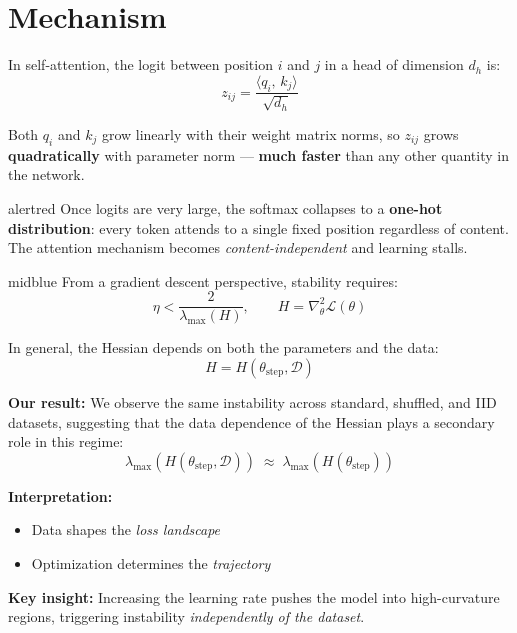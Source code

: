 \documentclass[12pt,a4paper]{article}
\newcommand{\important}[1]{\textbf{\color{midblue}#1}}
\begin{document}
\noindent
\begin{minipage}[t]{0.48\linewidth}
\section{Mechanism}

In self-attention, the logit between position $i$ and $j$ in a head of dimension $d_h$ is:
\[
z_{ij} = \frac{\langle q_i,\, k_j\rangle}{\sqrt{d_h}}
\]

Both $q_i$ and $k_j$ grow linearly with their weight matrix norms, so $z_{ij}$ grows
\textbf{quadratically} with parameter norm --- \important{much faster} than any other quantity
in the network.

\vspace{12pt}

\begin{claimbox}{alertred}
\small
Once logits are very large, the softmax collapses to a \textbf{one-hot distribution}:
every token attends to a single fixed position regardless of content.
The attention mechanism becomes \emph{content-independent} and learning stalls.
\end{claimbox}
\end{minipage}
\hfill
\begin{minipage}[t]{0.48\linewidth}
\vspace{0pt}

\begin{claimbox}{midblue}
\small
From a gradient descent perspective, stability requires:
\[
\eta < \frac{2}{\lambda_{\max}(H)}, \qquad H = \nabla^2_\theta \mathcal{L}(\theta)
\]

In general, the Hessian depends on both the parameters and the data:
\[
H = H(\theta_{\text{step}}, \mathcal{D})
\]

\medskip
\textbf{Our result:} We observe the same instability across standard, shuffled,
and IID datasets, suggesting that the data dependence of the Hessian plays a
secondary role in this regime:
\[
\lambda_{\max}(H(\theta_{\text{step}}, \mathcal{D}))
\;\approx\;
\lambda_{\max}(H(\theta_{\text{step}}))
\]
\end{claimbox}

\vspace{8pt}

\begin{tcolorbox}[
  enhanced,
  colback=accentyellow,
  colframe=accentorange,
  fonttitle=\bfseries\small,
  title=Interpretation,
  boxrule=1pt,
  arc=4pt,
  left=6pt, right=6pt, top=4pt, bottom=4pt
]
\small
\textbf{Interpretation:}
\begin{itemize}[leftmargin=12pt, itemsep=2pt]
\item Data shapes the \emph{loss landscape}
\item Optimization determines the \emph{trajectory}
\end{itemize}

\medskip
\textbf{Key insight:} Increasing the learning rate pushes the model into
high-curvature regions, triggering instability \emph{independently of the dataset}.
\end{tcolorbox}
\end{minipage}
\end{document}
